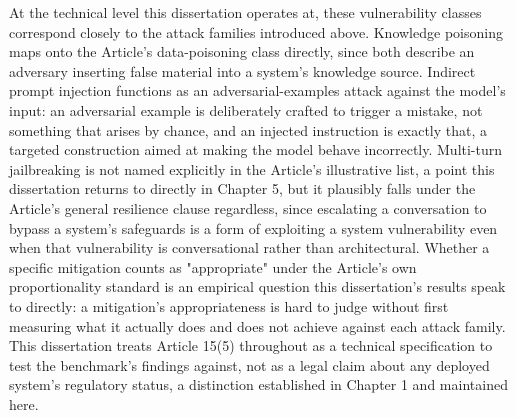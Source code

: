 At the technical level this dissertation operates at, these
vulnerability classes correspond closely to the attack families
introduced above. Knowledge poisoning maps onto the Article's
data-poisoning class directly, since both describe an adversary
inserting false material into a system's knowledge source. Indirect
prompt injection functions as an adversarial-examples attack against the
model's input: an adversarial example is deliberately crafted to trigger
a mistake, not something that arises by chance, and an injected
instruction is exactly that, a targeted construction aimed at making the
model behave incorrectly. Multi-turn jailbreaking is not named
explicitly in the Article's illustrative list, a point this dissertation
returns to directly in Chapter 5, but it plausibly falls under the
Article's general resilience clause regardless, since escalating a
conversation to bypass a system's safeguards is a form of exploiting a
system vulnerability even when that vulnerability is conversational
rather than architectural. Whether a specific mitigation counts as
"appropriate" under the Article's own proportionality standard is an
empirical question this dissertation's results speak to directly: a
mitigation's appropriateness is hard to judge without first measuring
what it actually does and does not achieve against each attack family.
This dissertation treats Article 15(5) throughout as a technical
specification to test the benchmark's findings against, not as a legal
claim about any deployed system's regulatory status, a distinction
established in Chapter 1 and maintained here.